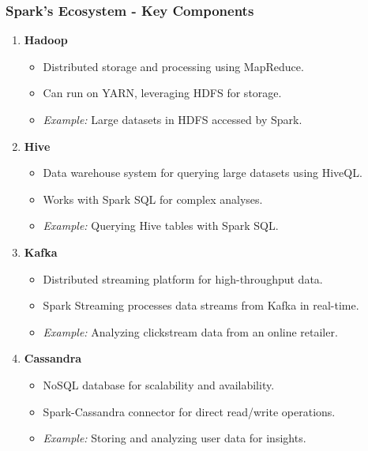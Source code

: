 \documentclass[aspectratio=169]{beamer}
\begin{document}
\begin{frame}[fragile]
    \frametitle{Spark's Ecosystem - Key Components}
    \begin{enumerate}
        \item \textbf{Hadoop}
        \begin{itemize}
            \item Distributed storage and processing using MapReduce.
            \item Can run on YARN, leveraging HDFS for storage.
            \item \textit{Example:} Large datasets in HDFS accessed by Spark.
        \end{itemize}
        
        \item \textbf{Hive}
        \begin{itemize}
            \item Data warehouse system for querying large datasets using HiveQL.
            \item Works with Spark SQL for complex analyses.
            \item \textit{Example:} Querying Hive tables with Spark SQL.
        \end{itemize}

        \item \textbf{Kafka}
        \begin{itemize}
            \item Distributed streaming platform for high-throughput data.
            \item Spark Streaming processes data streams from Kafka in real-time.
            \item \textit{Example:} Analyzing clickstream data from an online retailer.
        \end{itemize}
        
        \item \textbf{Cassandra}
        \begin{itemize}
            \item NoSQL database for scalability and availability.
            \item Spark-Cassandra connector for direct read/write operations.
            \item \textit{Example:} Storing and analyzing user data for insights.
        \end{itemize}
    \end{enumerate}
\end{frame}
\end{document}

